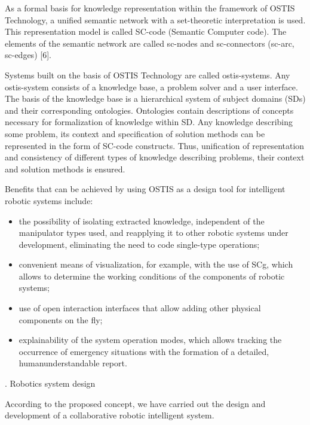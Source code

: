 \documentclass[10pt, letterpaper, twoside]{article}
\begin{document}
\begin{multicols}{2}
As a formal basis for knowledge representation within
the framework of OSTIS Technology, a unified semantic
network with a set-theoretic interpretation is used. This
representation model is called SC-code (Semantic Computer
code). The elements of the semantic network are
called sc-nodes and sc-connectors (sc-arc, sc-edges) [6].

Systems built on the basis of OSTIS Technology
are called ostis-systems. Any ostis-system consists of a
knowledge base, a problem solver and a user interface.
The basis of the knowledge base is a hierarchical system
of subject domains (SDs) and their corresponding
ontologies. Ontologies contain descriptions of concepts
necessary for formalization of knowledge within SD.
Any knowledge describing some problem, its context
and specification of solution methods can be represented
in the form of SC-code constructs. Thus, unification
of representation and consistency of different types of
knowledge describing problems, their context and solution
methods is ensured.

Benefits that can be achieved by using OSTIS as a
design tool for intelligent robotic systems include:
\begin{itemize}[noitemsep]
\item the possibility of isolating extracted knowledge,
independent of the manipulator types used, and
reapplying it to other robotic systems under development,
eliminating the need to code single-type
operations;

\item convenient means of visualization, for example, with
the use of SCg, which allows to determine the
working conditions of the components of robotic
systems;

\item use of open interaction interfaces that allow adding
other physical components on the fly;
\item explainability of the system operation modes, which
allows tracking the occurrence of emergency situations
with the formation of a detailed, humanunderstandable
report.
 \end{itemize}
\begin{center}

\MakeUppercase{}. Robotics system design

\end{center}
 According to the proposed concept, we have carried
out the design and development of a collaborative robotic
intelligent system.


\end{multicols}
\end{document}
